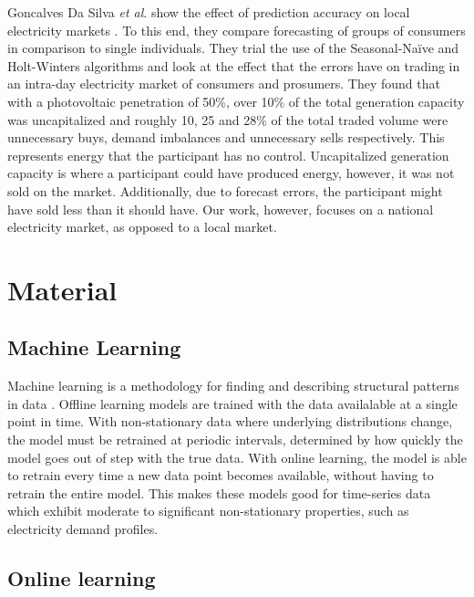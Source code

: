 Goncalves Da Silva \textit{et al}. show the effect of prediction accuracy on local electricity markets \cite{GoncalvesDaSilva2014}. To this end, they compare forecasting of groups of consumers in comparison to single individuals. They trial the use of the Seasonal-Naïve and Holt-Winters algorithms and look at the effect that the errors have on trading in an intra-day electricity market of consumers and prosumers. They found that with a photovoltaic penetration of 50\%, over 10\% of the total generation capacity was uncapitalized and roughly 10, 25 and 28\% of the total traded volume were unnecessary buys, demand imbalances and unnecessary sells respectively. This represents energy that the participant has no control. Uncapitalized generation capacity is where a participant could have produced energy, however, it was not sold on the market. Additionally, due to forecast errors, the participant might have sold less than it should have. Our work, however, focuses on a national electricity market, as opposed to a local market.





\section{Material}
\label{sec:material}

\subsection{Machine Learning}

Machine learning is a methodology for finding and describing structural patterns in data \cite{Witten2011}. Offline learning models are trained with the data availalable at a single point in time. With non-stationary data where underlying distributions change, the model must be retrained at periodic intervals, determined by how quickly the model goes out of step with the true data. With online learning, the model is able to retrain every time a new data point becomes available, without having to retrain the entire model. This makes these models good for time-series data which exhibit moderate to significant non-stationary properties, such as electricity demand profiles.





\subsection{Online learning}

